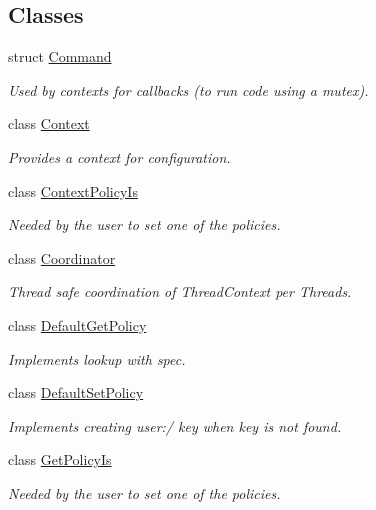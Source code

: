 \subsection*{Classes}
\begin{DoxyCompactItemize}
\item 
struct \hyperlink{structkdb_1_1Command}{Command}
\begin{DoxyCompactList}\small\item\em Used by contexts for callbacks (to run code using a mutex). \end{DoxyCompactList}\item 
class \hyperlink{classkdb_1_1Context}{Context}
\begin{DoxyCompactList}\small\item\em Provides a context for configuration. \end{DoxyCompactList}\item 
class \hyperlink{classkdb_1_1ContextPolicyIs}{Context\+Policy\+Is}
\begin{DoxyCompactList}\small\item\em Needed by the user to set one of the policies. \end{DoxyCompactList}\item 
class \hyperlink{classkdb_1_1Coordinator}{Coordinator}
\begin{DoxyCompactList}\small\item\em Thread safe coordination of Thread\+Context per Threads. \end{DoxyCompactList}\item 
class \hyperlink{classkdb_1_1DefaultGetPolicy}{Default\+Get\+Policy}
\begin{DoxyCompactList}\small\item\em Implements lookup with spec. \end{DoxyCompactList}\item 
class \hyperlink{classkdb_1_1DefaultSetPolicy}{Default\+Set\+Policy}
\begin{DoxyCompactList}\small\item\em Implements creating user\+:/ key when key is not found. \end{DoxyCompactList}\item 
class \hyperlink{classkdb_1_1GetPolicyIs}{Get\+Policy\+Is}
\begin{DoxyCompactList}\small\item\em Needed by the user to set one of the policies. \end{DoxyCompactList}\item 

\end{DoxyCompactItemize}
